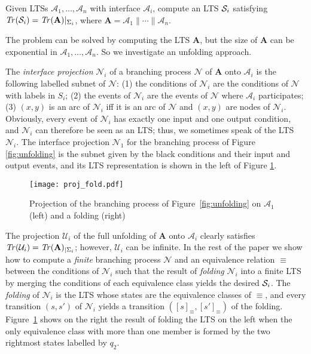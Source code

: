 \documentclass{llncs}
\def\A{\mathcal{A}}
\def\prod{\mathbf{A}}
\def\U{\mathcal{U}}
\def\N{\mathcal{N}}
\def\S{\mathcal{S}}
\def\eqrel{\equiv}
\newcommand{\Tr}[1]{{\it Tr}(#1)}
\renewcommand{\S}{{\cal S}}
\begin{document}
\begin{definition}
Given LTSs $\A_1, \ldots, \A_n$ with interface $\A_i$,
compute an LTS $\S_i$ satisfying $\Tr{\S_i} = \Tr{\prod}|_{\Sigma_i}$, 
where $\prod = \A_1 \parallel \cdots \parallel \A_n$. 
\end{definition}

The problem can be solved by computing the LTS $\prod$, but the size of $\prod$ 
can be exponential in $\A_1, \ldots, \A_n$. So we investigate an unfolding approach. 

The {\em interface projection} $\N_i$ of a branching process $\N$ of $\prod$ onto 
$\A_i$ is the following labelled subnet of $\N$:
(1) the conditions of $\N_i$ are the conditions of $\N$ with labels in $S_i$;
(2) the events of $\N_i$ are the events of $\N$  where $\A_i$ participates;
(3) $(x,y)$ is an arc of $\N_i$ if{}f it is an arc of $\N$ and $(x,y)$ are nodes of $\N_i$.
Obviously, every event of $\N_i$ has exactly one
input and one output condition, and $\N_i$ can therefore be seen as an LTS; thus, we sometimes
speak of the LTS $\N_i$. The interface projection $\N_1$ for the branching process of 
Figure \ref{fig:unfolding} is the subnet given by the black conditions and their input and output 
events, and its LTS representation is shown in the left of Figure \ref{fig:projection}. 


\begin{figure}[htbp]
\centering
\texttt{[image: proj\_fold.pdf]}
\caption{Projection of the branching process of Figure~\ref{fig:unfolding} on 
$\A_1$ (left) and a folding (right)}\label{fig:projection}
\end{figure}

The projection $\U_i$ of the full unfolding of $\prod$ onto $\A_i$ clearly 
satisfies $\Tr{\U_i} = \Tr{\prod}_{|\Sigma_i}$; however, $\U_i$ can be
infinite. In the rest of the paper we show how to compute a 
{\em finite} branching process $\N$ and an equivalence relation $\eqrel$ between the 
conditions of $\N_i$ such that the result of {\em folding} $\N_i$ into a finite 
LTS by merging the conditions of each equivalence class yields the desired $\S_i$. 
The {\em folding} of $\N_i$ 
is the LTS whose states are
the equivalence classes of $\equiv$, and every transition $(s,s')$ of $\N_i$ yields a 
transition $([s]_\equiv,[s']_\equiv)$ of the folding.
Figure~\ref{fig:projection} shows on the right
the result of folding the LTS on the left 
when the only equivalence class with more than one member is formed by the two rightmost states labelled by $q_2$.
\end{document}
